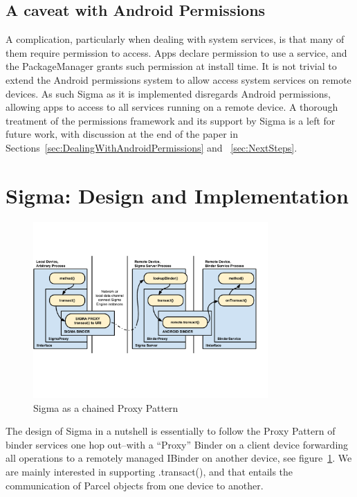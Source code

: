 \documentclass[prodmode]{acmlarge}
\begin{document}
\subsection{A caveat with Android Permissions}
A complication, particularly when dealing with system services, is that many of them require permission to access. Apps declare permission to use a service, and the PackageManager grants such permission at install time. It is not trivial to extend the Android permissions system to allow access system services on remote devices. As such Sigma as it is implemented disregards Android permissions, allowing apps to access to all services running on a remote device. A thorough treatment of the permissions framework and its support by Sigma is a left for future work, with discussion at the end of the paper in Sections~\ref{sec:DealingWithAndroidPermissions} and ~\ref{sec:NextSteps}.

\section{Sigma: Design and Implementation}
\label{sec:Sigma}
\begin{figure}[h]
\centering
\includegraphics[width=0.8\textwidth]{drawings/sigma_proxy_pattern.pdf}
\caption{Sigma as a chained Proxy Pattern}
\label{fig:SigmaChainProxy}
\end{figure}
The design of Sigma in a nutshell is essentially to follow the Proxy Pattern of binder services one hop out--with a ``Proxy'' Binder on a client device forwarding all operations to a remotely managed IBinder on another device, see figure~\ref{fig:SigmaChainProxy}. We are mainly interested in supporting .transact(), and that entails the communication of Parcel objects from one device to another.
\end{document}

